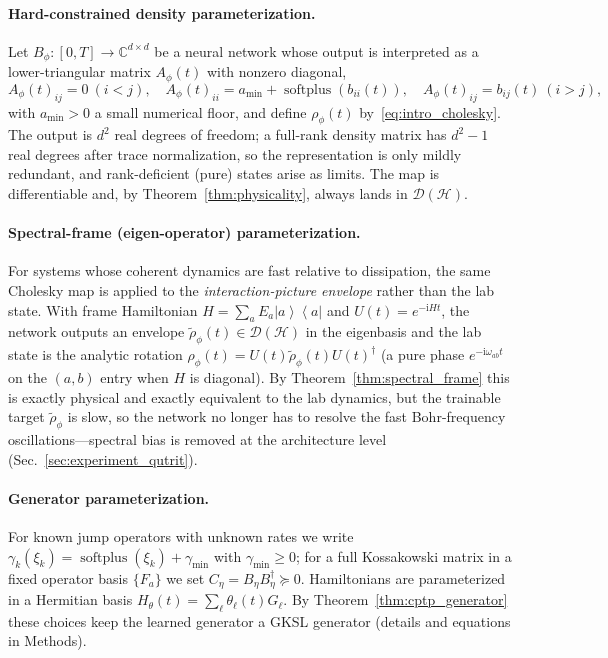 \documentclass[11pt]{article}
\DeclareMathOperator{\softplus}{softplus}
\newcommand{\C}{\mathbb{C}}
\newcommand{\calD}{\mathcal{D}}
\newcommand{\ii}{\mathrm{i}}
\newcommand{\ket}[1]{\left\lvert #1 \right\rangle}
\newcommand{\bra}[1]{\left\langle #1 \right\rvert}
\newcommand{\proj}[1]{\ket{#1}\!\bra{#1}}
\newcommand{\hilb}{\mathcal{H}}
\newcommand{\rhophi}{\rho_{\phi}}
\begin{document}
\paragraph{Hard-constrained density parameterization.}
Let $B_\phi:[0,T]\to\C^{d\times d}$ be a neural network whose output is interpreted as a lower-triangular matrix $A_\phi(t)$ with nonzero diagonal,
\begin{equation}
    A_\phi(t)_{ij}=0\ (i<j),\quad
    A_\phi(t)_{ii}=a_{\min}+\softplus(b_{ii}(t)),\quad
    A_\phi(t)_{ij}=b_{ij}(t)\ (i>j),
    \label{eq:A_definition}
\end{equation}
with $a_{\min}>0$ a small numerical floor, and define $\rhophi(t)$ by~\eqref{eq:intro_cholesky}. The output is $d^2$ real degrees of freedom; a full-rank density matrix has $d^2-1$ real degrees after trace normalization, so the representation is only mildly redundant, and rank-deficient (pure) states arise as limits. The map is differentiable and, by Theorem~\ref{thm:physicality}, always lands in $\calD(\hilb)$.

\paragraph{Spectral-frame (eigen-operator) parameterization.}
For systems whose coherent dynamics are fast relative to dissipation, the same Cholesky map is applied to the \emph{interaction-picture envelope} rather than the lab state. With frame Hamiltonian $H=\sum_aE_a\proj{a}$ and $U(t)=e^{-\ii Ht}$, the network outputs an envelope $\widetilde\rho_\phi(t)\in\calD(\hilb)$ in the eigenbasis and the lab state is the analytic rotation $\rhophi(t)=U(t)\widetilde\rho_\phi(t)U(t)^\dagger$ (a pure phase $e^{-\ii\omega_{ab}t}$ on the $(a,b)$ entry when $H$ is diagonal). By Theorem~\ref{thm:spectral_frame} this is exactly physical and exactly equivalent to the lab dynamics, but the trainable target $\widetilde\rho_\phi$ is slow, so the network no longer has to resolve the fast Bohr-frequency oscillations---spectral bias is removed at the architecture level (Sec.~\ref{sec:experiment_qutrit}).

\paragraph{Generator parameterization.}
For known jump operators with unknown rates we write $\gamma_k(\xi_k)=\softplus(\xi_k)+\gamma_{\min}$ with $\gamma_{\min}\ge0$; for a full Kossakowski matrix in a fixed operator basis $\{F_a\}$ we set $C_\eta=B_\eta B_\eta^\dagger\succeq0$. Hamiltonians are parameterized in a Hermitian basis $H_\theta(t)=\sum_\ell\theta_\ell(t)G_\ell$. By Theorem~\ref{thm:cptp_generator} these choices keep the learned generator a GKSL generator (details and equations in Methods).
\end{document}
